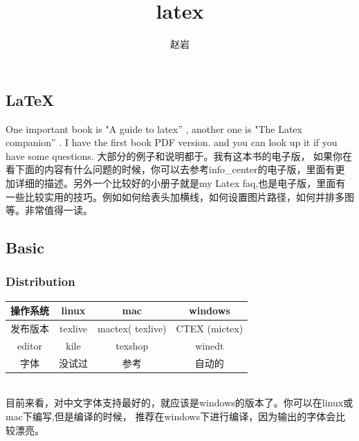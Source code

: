 \documentclass[a4paper,12pt,twoside]{book}
\begin{document}
\begin{CJK*}{UTF8}{song}

\title{latex}
\author{赵岩}
\date{}\maketitle

\else
\chapter{\LaTeX}
\fi


	One important book is "A guide to latex'' \cite{Guide}, another one is "The Latex companion'' \cite{Companion}. I have the first book PDF version. and you can look up it if you have some questions. 大部分的例子和说明都于\cite{Guide}。我有这本书的电子版， 如果你在看下面的内容有什么问题的时候，你可以去参考info_center的电子版，里面有更加详细的描述。另外一个比较好的小册子就是my Latex faq,也是电子版，里面有一些比较实用的技巧。例如如何给表头加横线，如何设置图片路径，如何并排多图等。非常值得一读。
	
\section{Basic}
	\subsection{Distribution}
		\begin{tabular}{|c|c|c|c|}
		\hline 操作系统 & linux & mac & windows \\
		\hline 发布版本 & texlive & mactex( texlive) & CTEX (mictex) \\
		\hline editor & kile & texshop & winedt \\
		\hline 字体 & 没试过 & 参考\cite{MacFont} & 自动的 \\
		\hline
		\end{tabular} \\
    目前来看，对中文字体支持最好的，就应该是windows的版本了。你可以在linux或mac下编写,但是编译的时候， 推荐在windows下进行编译，因为输出的字体会比较漂亮。



\end{CJK*}
\end{document}

